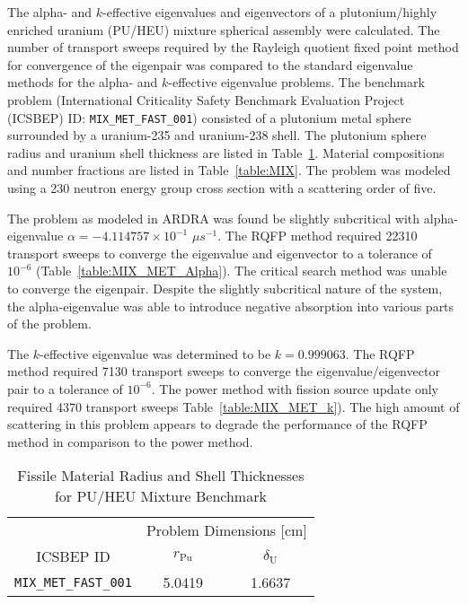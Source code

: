 The alpha- and $k$-effective eigenvalues and eigenvectors of a plutonium/highly enriched uranium (PU/HEU) mixture spherical assembly were calculated. The number of transport sweeps required by the Rayleigh quotient fixed point method for convergence of the eigenpair was compared to the standard eigenvalue methods for the alpha- and $k$-effective eigenvalue problems. The benchmark problem (International Criticality Safety Benchmark Evaluation Project (ICSBEP) ID: \texttt{MIX\_MET\_FAST\_001}) consisted of a plutonium metal sphere surrounded by a uranium-235 and uranium-238 shell. The plutonium sphere radius and uranium shell thickness are listed in Table~\ref{table:MIX_MET_Dims}. Material compositions and number fractions are listed in Table~\ref{table:MIX}. The problem was modeled using a 230 neutron energy group cross section with a scattering order of five. 

The problem as modeled in ARDRA was found be slightly subcritical with alpha-eigen\-value $\alpha = -4.114757 \times 10^{-1}$ $\mu s^{-1}$. The RQFP method required 22310 transport sweeps to converge the eigenvalue and eigenvector to a tolerance of $10^{-6}$ (Table~\ref{table:MIX_MET_Alpha}). The critical search method was unable to converge the eigenpair. Despite the slightly subcritical nature of the system, the alpha-eigenvalue was able to introduce negative absorption into various parts of the problem.

The $k$-effective eigenvalue was determined to be $k = 0.999063$. The RQFP method required 7130 transport sweeps to converge the eigenvalue/eigenvector pair to a tolerance of $10^{-6}$. The power method with fission source update only required 4370 transport sweeps Table~\ref{table:MIX_MET_k}). The high amount of scattering in this problem appears to degrade the performance of the RQFP method in comparison to the power method.

\begin{table}[!htbp]
	\centering{}
	\begin{tabular}{@{}ccc@{}}\toprule
	& \multicolumn{2}{c}{Problem Dimensions [cm]} \\
	\cmidrule{2-3} ICSBEP ID & $r_{\text{Pu}}$ & $\delta_{\text{U}}$ \\
	\midrule
	\texttt{MIX\_MET\_FAST\_001} & 5.0419 & 1.6637 \\
	\bottomrule
	\end{tabular}
	\caption{Fissile Material Radius and Shell Thicknesses for PU/HEU Mixture Benchmark}
	\label{table:MIX_MET_Dims}
\end{table}

